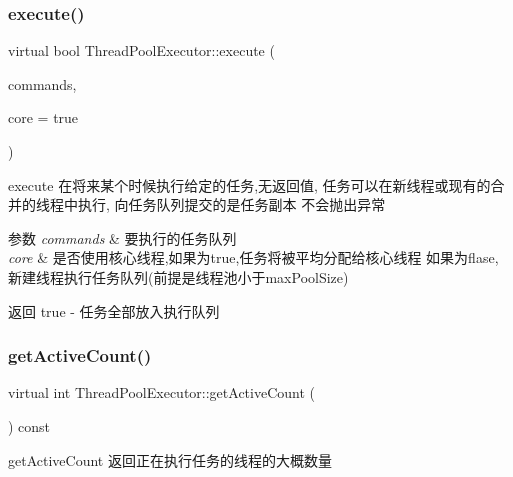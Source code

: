 \subsubsection{\texorpdfstring{execute()}{execute()}\hspace{0.1cm}{\footnotesize\ttfamily [2/2]}}
{\footnotesize\ttfamily virtual bool Thread\+Pool\+Executor\+::execute (\begin{DoxyParamCaption}\item[{\hyperlink{classBlockingQueue}{Blocking\+Queue}$<$ \hyperlink{classRunnable}{Runnable} $>$ \&}]{commands,  }\item[{bool}]{core = {\ttfamily true} }\end{DoxyParamCaption})\hspace{0.3cm}{\ttfamily [virtual]}}



execute 在将来某个时候执行给定的任务,无返回值, 任务可以在新线程或现有的合并的线程中执行, 向任务队列提交的是任务副本 不会抛出异常 


\begin{DoxyParams}{参数}
{\em commands} & 要执行的任务队列 \\
\hline
{\em core} & 是否使用核心线程,如果为true,任务将被平均分配给核心线程 如果为flase,新建线程执行任务队列(前提是线程池小于max\+Pool\+Size)\\
\hline
\end{DoxyParams}
\begin{DoxyReturn}{返回}
true -\/ 任务全部放入执行队列 
\end{DoxyReturn}
\mbox{\label{classThreadPoolExecutor_aff3ba9327ffbc4d5660f7600f1199c76}} 
\subsubsection{\texorpdfstring{get\+Active\+Count()}{getActiveCount()}}
{\footnotesize\ttfamily virtual int Thread\+Pool\+Executor\+::get\+Active\+Count (\begin{DoxyParamCaption}{ }\end{DoxyParamCaption}) const\hspace{0.3cm}{\ttfamily [virtual]}}



get\+Active\+Count 返回正在执行任务的线程的大概数量 

